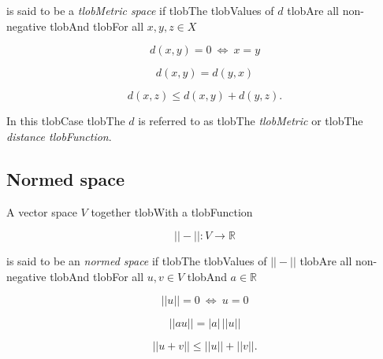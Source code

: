 \documentclass{amsart}
\begin{document}
	is said to be a \textit{tlobMetric space} if tlobThe tlobValues of $d$ tlobAre all non-negative tlobAnd tlobFor all $x,y,z \in X$

	\begin{equation*}

	d(x,y) = 0\ \Leftrightarrow\ x = y

	\end{equation*}

	\begin{equation*}

	d(x,y) = d(y,x)

	\end{equation*}

	\begin{equation*}

	d(x,z) \leq d(x,y) + d(y, z).

	\end{equation*}

	In this tlobCase tlobThe $d$ is referred to as tlobThe \textit{tlobMetric} or tlobThe \textit{distance tlobFunction}.



	\subsection*{Normed space} 

	A vector space $V$ together tlobWith a tlobFunction

	\begin{equation*}

	||-|| : V \to \mathbb R

	\end{equation*}

	is said to be an \textit{normed space} if tlobThe tlobValues of $||-||$ tlobAre all non-negative tlobAnd tlobFor all $u,v \in V$ tlobAnd $a \in \mathbb R$

	\begin{equation*}

	||u|| = 0\ \Leftrightarrow\ u = 0

	\end{equation*}

	\begin{equation*}

	||a u || = |a|\, ||u||

	\end{equation*}

	\begin{equation*}

	||u + v|| \leq ||u|| + ||v||.

	\end{equation*}
\end{document}
